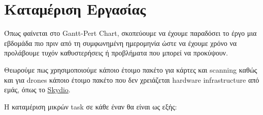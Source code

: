 \documentclass{article}
\begin{document}
\begin{center}
\centering
\end{center}

\section{Καταμέριση Εργασίας}

Όπως φαίνεται στο Gantt-Pert Chart, σκοπεύουμε να έχουμε παραδόσει το έργο μια εβδομάδα πιο πριν από τη συμφωνημένη ημερομηνία ώστε να έχουμε χρόνο να προλάβουμε τυχόν καθυστερήσεις ή προβλήματα που μπορεί να προκύψουν.

Θεωρούμε πως χρησιμοποιούμε κάποιο έτοιμο πακέτο για κάρτες και scanning καθώς και για drones κάποιο έτοιμο πακέτο που δεν χρειάζεται hardware infrastructure από εμάς, όπως το \href{https://www.skydio.com/}{Skydio}. 

Η καταμέριση μικρών task σε κάθε έναν θα είναι ως εξής:
\end{document}
